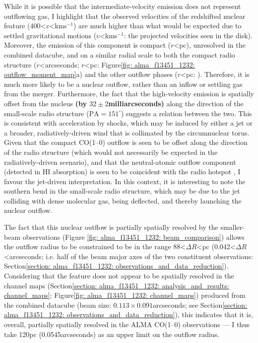 While it is possible that the intermediate-velocity emission does not represent outflowing gas, I highlight that the observed velocities of the redshifted nuclear feature (400\;\textless\;$v$\;\textless{}\;km\;s$^{-1}$) are much higher than what would be expected due to settled gravitational motions ($v$\;\textless{}\;km\;s$^{-1}$: the projected velocities seen in the disk). Moreover, the emission of this component is compact ($r$\;\textless{}\;pc), unresolved in the combined datacube, and on a similar radial scale to both the compact radio structure ($r$\;\textless{}\;arcseconds; $r$\;\textless{}\;pc: Figure\;\ref{fig: alma_f13451_1232: outflow_moment_map}a) and the other outflow phases ($r$\;\textless{}\;pc: \citealt{Morganti2013_4c1250, Tadhunter2018}). Therefore, it is much more likely to be a nuclear outflow, rather than an inflow or settling gas from the merger. Furthermore, the fact that the high-velocity emission is spatially offset from the nucleus \textbf{(by $32\pm2$\;milliarcseconds)} along the direction of the small-scale radio structure ($\mathrm{PA}=151^\circ$) suggests a relation between the two. This is consistent with acceleration by shocks, which may be induced by either a jet or a broader, radiatively-driven wind that is collimated by the circumnuclear torus. Given that the compact CO(1--0) outflow is seen to be offset along the direction of the radio structure (which would not necessarily be expected in the radiatively-driven scenario), and that the neutral-atomic outflow component (detected in HI absorption) is seen to be coincident with the radio hotspot \citep{Morganti2013_4c1250}, I favour the jet-driven interpretation. In this context, it is interesting to note the southern bend in the small-scale radio structure, which may be due to the jet colliding with dense molecular gas, being deflected, and thereby launching the nuclear outflow.

The fact that this nuclear outflow is partially spatially resolved by the smaller-beam observations (Figure \ref{fig: alma_f13451_1232: beam_comparison}) allows the outflow radius to be constrained to be in the range 88\;\textless\;$\Delta{R}$\;\textless{}\;pc (0.042\;\textless\;$\Delta{R}$\;\textless{}\;arcseconds; i.e. half of the beam major axes of the two constituent observations: Section\;\ref{section: alma_f13451_1232: observations_and_data_reduction}). Considering that the feature does not appear to be spatially resolved in the channel maps (Section\;\ref{section: alma_f13451_1232: analysis_and_results: channel_maps}; Figure\;\ref{fig: alma_f13451_1232: channel_maps}) produced from the combined datacube (beam size: $0.113\times0.091$\;arcseconds; see Section\;\ref{section: alma_f13451_1232: observations_and_data_reduction}), this indicates that it is, overall, partially spatially resolved in the ALMA CO(1--0) observations --- I thus take 120\;pc (0.0545\;arcseconds) as an upper limit on the outflow radius.

